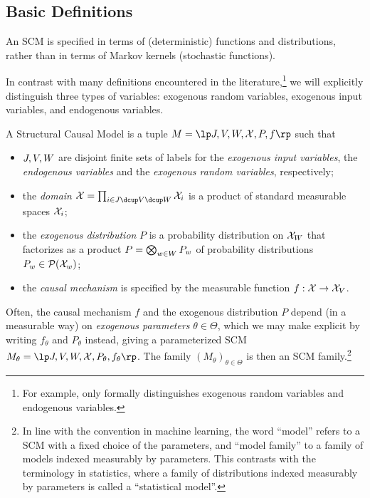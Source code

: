 \subsection{Basic Definitions}

An SCM is specified in terms of (deterministic) functions and distributions,
rather than in terms of Markov kernels (stochastic functions).

In contrast with many definitions encountered in the literature,\footnote{For
example, \cite{Pearl09} only formally distinguishes exogenous random variables and 
endogenous variables.} we will explicitly distinguish
three types of variables: exogenous random variables, exogenous input variables, and endogenous variables.
\begin{Def}\label{def:scm}
  A Structural Causal Model is a tuple $M = \lt \Sin, \Send, \Srnd, \CX, P, f \rt$ such that
  \begin{itemize}
    \item $J, V, W$ are disjoint finite sets of labels for the \emph{exogenous input variables}, the \emph{endogenous variables} and the \emph{exogenous random variables}, respectively;
    \item the \emph{domain} $\CX = \prod_{i\in \Sin \dcup \Send \dcup \Srnd} \C{X}_i$ is a product of standard measurable spaces $\mathcal{X}_i$;
    \item the \emph{exogenous distribution} $P$ is a probability distribution on $\mathcal{X}_{W}$ that factorizes as a product $P = \bigotimes_{w\in W} P_w$ of probability distributions $P_w \in \mathcal{P}(\mathcal{X}_w)$;
    \item the \emph{causal mechanism} is specified by the measurable function $f : \mathcal{X} \to \mathcal{X}_{V}$.
  \end{itemize}
Often, the causal mechanism $f$ and the exogenous distribution $P$ depend (in a measurable way) on 
\emph{exogenous parameters} $\theta\in\Theta$, which we may make explicit by writing
$f_{\theta}$ and $P_{\theta}$ instead, giving a parameterized SCM
$M_{\theta} = \lt \Sin, \Send, \Srnd, \CX, P_{\theta}, f_{\theta} \rt$.
The family $(M_{\theta})_{\theta \in \Theta}$ is then an SCM family.\footnote{In line with the convention in machine learning, the word ``model'' refers to a SCM with a fixed choice of the parameters, and ``model family'' to a family of models
indexed measurably by parameters. This contrasts with the terminology in statistics, where a family
of distributions indexed measurably by parameters is called a ``statistical model''.} 
\end{Def}

